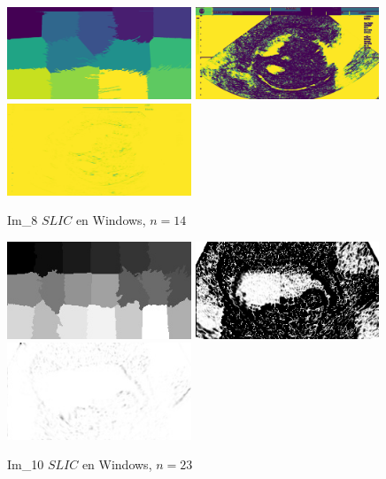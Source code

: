 \documentclass[a4paper,10pt,twocolumn]{article}
\begin{document}
\begin{center}
	\begin{figure}[!htb]
		\centering
		\includegraphics[width=5.5cm]{image/slic/im_8_color_14}
		\includegraphics[width=5.5cm]{image/slic/im_8_black_14}
		\includegraphics[width=5.5cm]{image/slic/im_8_white_14}
		\caption{Im\_8 $SLIC$ en Windows, $n = 14$}
	\end{figure}
\end{center}

\begin{center}
	\begin{figure}[!htb]
		\centering
		\includegraphics[width=5.5cm]{image/slic/im_10_color_23}
		\includegraphics[width=5.5cm]{image/slic/im_10_black_23}
		\includegraphics[width=5.5cm]{image/slic/im_10_white_23}
		\caption{Im\_10 $SLIC$ en Windows, $n = 23$}
	\end{figure}
\end{center}
\end{document}
